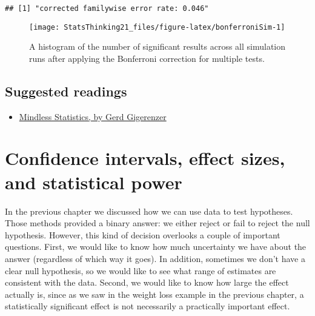 \documentclass[]{book}
\newenvironment{Shaded}{\begin{snugshade}}{\end{snugshade}}
\newcommand{\KeywordTok}[1]{\textcolor[rgb]{0.13,0.29,0.53}{\textbf{#1}}}
\newcommand{\DecValTok}[1]{\textcolor[rgb]{0.00,0.00,0.81}{#1}}
\newcommand{\FloatTok}[1]{\textcolor[rgb]{0.00,0.00,0.81}{#1}}
\newcommand{\StringTok}[1]{\textcolor[rgb]{0.31,0.60,0.02}{#1}}
\newcommand{\CommentTok}[1]{\textcolor[rgb]{0.56,0.35,0.01}{\textit{#1}}}
\newcommand{\OperatorTok}[1]{\textcolor[rgb]{0.81,0.36,0.00}{\textbf{#1}}}
\newcommand{\NormalTok}[1]{#1}
\providecommand{\tightlist}{%
  \setlength{\itemsep}{0pt}\setlength{\parskip}{0pt}}
\theoremstyle{definition}
\theoremstyle{definition}
\theoremstyle{definition}
\theoremstyle{remark}
\begin{document}
\begin{Shaded}
\end{Shaded}

\begin{verbatim}
## [1] "corrected familywise error rate: 0.046"
\end{verbatim}

\begin{figure}
\texttt{[image: StatsThinking21\_files/figure-latex/bonferroniSim-1]} \caption{A histogram of the number of significant results across all simulation runs after applying the Bonferroni correction for multiple tests.}\label{fig:bonferroniSim}
\end{figure}

\section{Suggested readings}\label{suggested-readings-6}

\begin{itemize}
\tightlist
\item
  \href{https://library.mpib-berlin.mpg.de/ft/gg/GG_Mindless_2004.pdf}{Mindless
  Statistics, by Gerd Gigerenzer}
\end{itemize}

\chapter{Confidence intervals, effect sizes, and statistical
power}\label{ci-effect-size-power}

In the previous chapter we discussed how we can use data to test
hypotheses. Those methods provided a binary answer: we either reject or
fail to reject the null hypothesis. However, this kind of decision
overlooks a couple of important questions. First, we would like to know
how much uncertainty we have about the answer (regardless of which way
it goes). In addition, sometimes we don't have a clear null hypothesis,
so we would like to see what range of estimates are consistent with the
data. Second, we would like to know how large the effect actually is,
since as we saw in the weight loss example in the previous chapter, a
statistically significant effect is not necessarily a practically
important effect.
\end{document}
